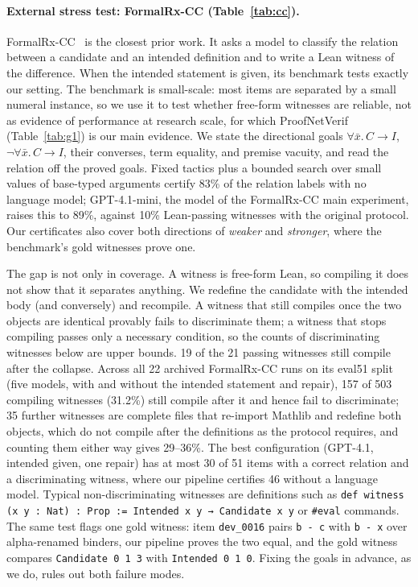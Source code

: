 \documentclass[10pt]{article}
\theoremstyle{definition}
\begin{document}
\paragraph{External stress test: FormalRx-CC (Table~\ref{tab:cc}).} FormalRx-CC~\cite{formalrxcc}
is the closest prior work. It asks a model to classify the relation between a candidate and an
intended definition and to write a Lean witness of the difference. When the intended statement is
given, its benchmark tests exactly our setting. The benchmark is small-scale: most items are
separated by a small numeral instance, so we use it to test whether free-form witnesses are
reliable, not as evidence of performance at research scale, for which ProofNetVerif
(Table~\ref{tab:g1}) is our main evidence. We state the directional goals $\forall\bar x.\,C\to I$, $\neg\forall\bar x.\,C\to I$, their
converses, term equality, and premise vacuity, and read the relation off the proved goals.
Fixed tactics plus a bounded search over small values of base-typed arguments certify 83\% of the
relation labels with no language model; GPT-4.1-mini, the model of the FormalRx-CC main experiment,
raises this to 89\%, against 10\% Lean-passing witnesses with the original protocol. Our
certificates also cover both directions of \emph{weaker} and \emph{stronger}, where the
benchmark's gold witnesses prove one.

The gap is not only in coverage. A witness is free-form Lean, so compiling it does not show
that it separates anything. We redefine the candidate with the intended body (and conversely)
and recompile. A witness that still compiles once the two objects are identical provably fails
to discriminate them; a witness that stops compiling passes only a necessary condition, so the
counts of discriminating witnesses below are upper bounds. 19 of the 21 passing witnesses still
compile after the collapse. Across all 22 archived FormalRx-CC runs on its eval51 split (five
models, with and without the intended statement and repair), 157 of 503 compiling witnesses
(31.2\%) still compile after it and hence fail to discriminate; 35 further witnesses are
complete files that re-import Mathlib and redefine both objects, which do not compile after the
definitions as the protocol requires, and counting them either way gives 29--36\%. The best configuration (GPT-4.1,
intended given, one repair) has at most 30 of 51 items with a correct relation and a
discriminating witness, where our pipeline certifies 46 without a language model. Typical
non-discriminating witnesses are definitions such as
\texttt{def witness (x y : Nat) : Prop := Intended x y → Candidate x y} or \texttt{\#eval}
commands. The same test flags one gold witness: item \texttt{dev\_0016} pairs
\texttt{b - c} with \texttt{b - x} over alpha-renamed binders, our pipeline proves the two
equal, and the gold witness compares \texttt{Candidate 0 1 3} with \texttt{Intended 0 1 0}.
Fixing the goals in advance, as we do, rules out both failure modes.
\end{document}
